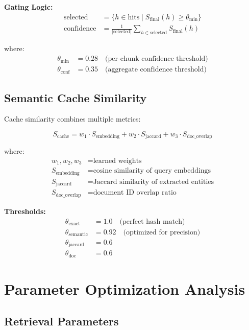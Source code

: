 \documentclass[11pt,a4paper]{article}
\begin{document}
\textbf{Gating Logic:}
\begin{align}
\text{selected} &= \{h \in \text{hits} \mid S_{\text{final}}(h) \geq \theta_{\text{min}}\}\\
\text{confidence} &= \frac{1}{|\text{selected}|} \sum_{h \in \text{selected}} S_{\text{final}}(h)
\end{align}

where:
\begin{align}
\theta_{\text{min}} &= 0.28 \quad \text{(per-chunk confidence threshold)}\\
\theta_{\text{conf}} &= 0.35 \quad \text{(aggregate confidence threshold)}
\end{align}

\subsection{Semantic Cache Similarity}

Cache similarity combines multiple metrics:

\begin{equation}
S_{\text{cache}} = w_1 \cdot S_{\text{embedding}} + w_2 \cdot S_{\text{jaccard}} + w_3 \cdot S_{\text{doc\_overlap}}
\end{equation}

where:
\begin{align}
w_1, w_2, w_3 &= \text{learned weights}\\
S_{\text{embedding}} &= \text{cosine similarity of query embeddings}\\
S_{\text{jaccard}} &= \text{Jaccard similarity of extracted entities}\\
S_{\text{doc\_overlap}} &= \text{document ID overlap ratio}
\end{align}

\textbf{Thresholds:}
\begin{align}
\theta_{\text{exact}} &= 1.0 \quad \text{(perfect hash match)}\\
\theta_{\text{semantic}} &= 0.92 \quad \text{(optimized for precision)}\\
\theta_{\text{jaccard}} &= 0.6\\
\theta_{\text{doc}} &= 0.6
\end{align}

\section{Parameter Optimization Analysis}

\subsection{Retrieval Parameters}
\end{document}
